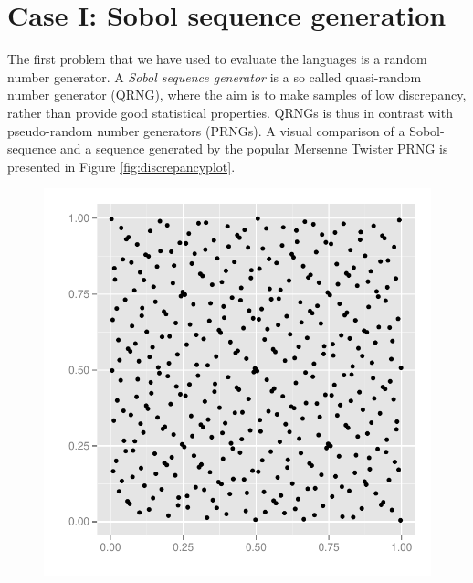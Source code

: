 \documentclass{llncs2e/llncs}
\begin{document}
\section{Case I: Sobol sequence generation}
The first problem that we have used to evaluate the languages is a
random number generator. A \emph{Sobol sequence generator} is a so
called quasi-random number generator (QRNG), where the aim is to make
samples of low discrepancy, rather than provide good statistical
properties. QRNGs is thus in contrast with pseudo-random number
generators (PRNGs). A visual comparison of a Sobol-sequence and a
sequence generated by the popular Mersenne Twister PRNG is presented
in Figure \ref{fig:discrepancyplot}.
\begin{figure}
  \centering
  \begin{minipage}{0.45\linewidth}
    \begin{center}
      \includegraphics[width=\textwidth]{../report/graphics/2D-sobol-sequence.pdf}


\end{center}
\end{minipage}
\end{figure}
\end{document}
